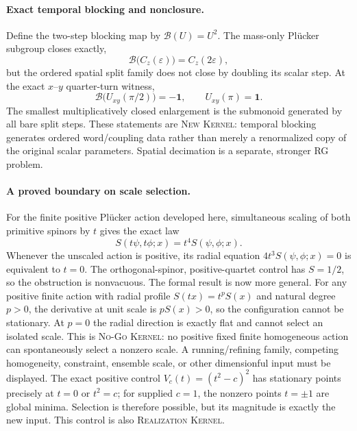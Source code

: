\documentclass[11pt]{article}
\newcommand{\Kernel}{\textcolor{kernelcolor}{\textsc{Kernel}}}
\newcommand{\NewResult}{\textsc{New}}
\newcommand{\Realization}{\textsc{Realization}}
\newcommand{\NoGo}{\textsc{No-Go}}
\newcommand{\id}{\mathbf{1}}
\begin{document}
\paragraph{Exact temporal blocking and nonclosure.}
Define the two-step blocking map by $\mathcal B(U)=U^2$.  The mass-only
Pl\"ucker subgroup closes exactly,
\[
 \mathcal B\bigl(C_z(\varepsilon)\bigr)=C_z(2\varepsilon),
\]
but the ordered spatial split family does not close by doubling its scalar
step.  At the exact $x$--$y$ quarter-turn witness,
\begin{equation}\label{eq:rgcounterexample}
 \mathcal B\bigl(U_{xy}(\pi/2)\bigr)=-\id,
 \qquad U_{xy}(\pi)=\id.
\end{equation}
The smallest multiplicatively closed enlargement is the submonoid generated
by all bare split steps.  These statements are \NewResult{} \Kernel{}: temporal
blocking generates ordered word/coupling data rather than merely a
renormalized copy of the original scalar parameters.  Spatial decimation is a
separate, stronger RG problem.

\paragraph{A proved boundary on scale selection.}
For the finite positive Pl\"ucker action developed here, simultaneous scaling
of both primitive spinors by $t$ gives the exact law
\begin{equation}\label{eq:quarticscalenogo}
 S(t\psi,t\phi;x)=t^4S(\psi,\phi;x).
\end{equation}
Whenever the unscaled action is positive, its radial equation
$4t^3S(\psi,\phi;x)=0$ is equivalent to $t=0$.  The orthogonal-spinor,
positive-quartet control has $S=1/2$, so the obstruction is nonvacuous.
The formal result is now more general.  For any positive finite action with
radial profile $S(tx)=t^pS(x)$ and natural degree $p>0$, the derivative at unit
scale is $pS(x)>0$, so the configuration cannot be stationary.  At $p=0$ the
radial direction is exactly flat and cannot select an isolated scale.  This is
\NoGo{} \Kernel{}: no positive fixed finite homogeneous action can
spontaneously select a nonzero scale.  A running/refining family, competing
homogeneity, constraint, ensemble scale, or other dimensionful input must be
displayed.
The exact positive control $V_c(t)=(t^2-c)^2$ has stationary points precisely
at $t=0$ or $t^2=c$; for supplied $c=1$, the nonzero points $t=\pm1$ are global
minima.  Selection is therefore possible, but its magnitude is exactly the
new input.  This control is also \Realization{} \Kernel{}.
\end{document}
